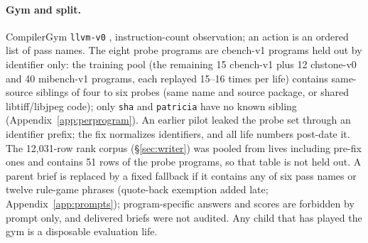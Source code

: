 \documentclass{article}
\begin{document}
\paragraph{Gym and split.} CompilerGym \texttt{llvm-v0} \citep{cummins2021compilergym}, instruction-count observation; an action is an ordered list of pass names. The eight probe programs are cbench-v1 programs held out by identifier only: the training pool (the remaining 15 cbench-v1 plus 12 chstone-v0 and 40 mibench-v1 programs, each replayed 15--16 times per life) contains same-source siblings of four to six probes (same name and source package, or shared libtiff/libjpeg code); only \texttt{sha} and \texttt{patricia} have no known sibling (Appendix~\ref{app:perprogram}). An earlier pilot leaked the probe set through an identifier prefix; the fix normalizes identifiers, and all life numbers post-date it. The 12{,}031-row rank corpus (\S\ref{sec:writer}) was pooled from lives including pre-fix ones and contains 51 rows of the probe programs, so that table is not held out. A parent brief is replaced by a fixed fallback if it contains any of six pass names or twelve rule-game phrases (quote-back exemption added late; Appendix~\ref{app:prompts}); program-specific answers and scores are forbidden by prompt only, and delivered briefs were not audited. Any child that has played the gym is a disposable evaluation life.
\end{document}
